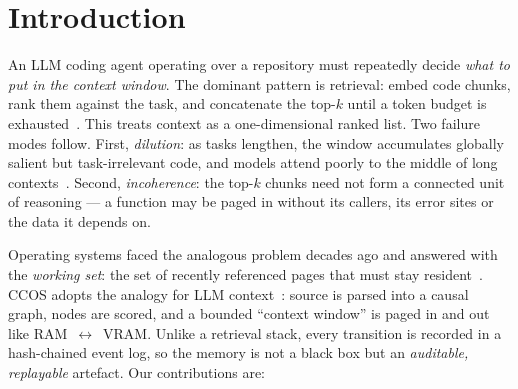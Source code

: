 \documentclass[11pt]{article}
\begin{document}
\begin{abstract}
on the exact step at which the right information was evicted from the window. We release the engine, the
honest validation harness, and this paper, labelling throughout what is
\emph{proven} (formal structure, determinism, replay), \emph{measured} (retrieval
coverage --- where CCOS does \emph{not} beat lexical RAG on real bugs), and the one
axis where CCOS \emph{does} win: \textbf{efficiency}. Run end-to-end on real
single-file fixes with a 30B model and a compiler-in-the-loop retry, CCOS and RAG
resolve \emph{equally} ($2/10$), but CCOS does so on $776$ context tokens against
the lexical retriever's $5366$ --- a $6.9\times$ reduction (and $4.1$--$9.1\times$
across $51$ fixes from three crates, model-free), because the causal region stops
at the working set rather than padding a top-$k$ to budget. CCOS is thus not a
better retriever or solver, but a more \emph{frugal}, \emph{auditable} one --- it
self-calibrates, with no $k$ to tune. (On its own source tree, region selection covers a task's $k$-hop
neighbourhood with recall $0.97$ vs $0.35$ flat at $\approx\!48\%$ fewer tokens;
regions are $95.5\%$ internally connected.)
\end{abstract}

\section{Introduction}

An LLM coding agent operating over a repository must repeatedly decide \emph{what
to put in the context window}. The dominant pattern is retrieval: embed code
chunks, rank them against the task, and concatenate the top-$k$ until a token
budget is exhausted~\cite{lewis2020rag}. This treats context as a one-dimensional
ranked list. Two failure modes follow. First, \emph{dilution}: as tasks lengthen,
the window accumulates globally salient but task-irrelevant code, and models
attend poorly to the middle of long contexts~\cite{liu2023lost}. Second,
\emph{incoherence}: the top-$k$ chunks need not form a connected unit of
reasoning --- a function may be paged in without its callers, its error sites or
the data it depends on.

Operating systems faced the analogous problem decades ago and answered with the
\emph{working set}: the set of recently referenced pages that must stay
resident~\cite{denning1968working}. CCOS adopts the analogy for LLM
context~\cite{packer2023memgpt}: source is parsed into a causal
graph, nodes are scored, and a bounded ``context window'' is paged in and out
like RAM~$\leftrightarrow$~VRAM. Unlike a retrieval stack, every transition is
recorded in a hash-chained event log, so the memory is not a black box but an
\emph{auditable, replayable} artefact. Our contributions are:
\end{document}
